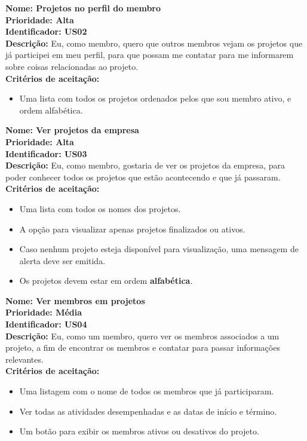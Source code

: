 \begin{anexosenv}
\indent \textbf{Nome: Projetos no perfil do membro\\
    \indent Prioridade: Alta\\
    \indent Identificador: US02\\
    \indent Descrição:} Eu, como membro, quero que outros membros vejam os projetos que já participei em meu perfil, para que possam me contatar para me informarem sobre coisas relacionadas ao projeto.\\
\indent \textbf{Critérios de aceitação:}
\begin{itemize}
    \item Uma lista com todos os projetos ordenados pelos que sou membro ativo, e ordem alfabética.
\end{itemize}

\indent \textbf{Nome: Ver projetos da empresa\\
    \indent Prioridade: Alta\\
    \indent Identificador: US03\\
    \indent Descrição:} Eu, como membro, gostaria de ver os projetos da empresa, para poder conhecer todos os projetos que estão acontecendo e que já passaram.\\
\indent \textbf{Critérios de aceitação:}
\begin{itemize}
    \item Uma lista com todos os nomes dos projetos.
    \item A opção para visualizar apenas projetos finalizados ou ativos.
    \item Caso nenhum projeto esteja disponível para visualização, uma mensagem de alerta deve ser emitida.
    \item Os projetos devem estar em ordem \textbf{alfabética}.
\end{itemize}

\indent \textbf{Nome:  Ver membros em projetos\\
    \indent Prioridade: Média\\
    \indent Identificador: US04\\
    \indent Descrição:} Eu, como um membro, quero ver os membros associados a um projeto, a fim de encontrar os membros e contatar para passar informações relevantes.\\
\indent \textbf{Critérios de aceitação:}
\begin{itemize}
    \item Uma listagem com o nome de todos os membros que já participaram.
    \item Ver todas as atividades desempenhadas e as datas de início e término.
    \item Um botão para exibir os membros ativos ou desativos do projeto.
\end{itemize}


\end{anexosenv}
